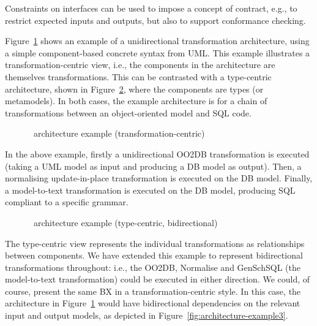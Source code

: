 Constraints on interfaces can be used to impose a concept of contract, e.g., to restrict expected inputs and outputs, but also to support conformance checking.

Figure~\ref{fig:architecture-example1} shows an example of a unidirectional transformation architecture, using a simple component-based concrete syntax from UML. This example illustrates a transformation-centric view, i.e., the components in the architecture are themselves transformations. This can be contrasted with a type-centric architecture, shown in Figure~\ref{fig:architecture-example2}, where the components are types (or metamodels). In both cases, the example architecture is for a chain of transformations between an object-oriented model and SQL code.

\begin{figure}[htbp]
\caption{\transml\ architecture example (transformation-centric)}
\label{fig:architecture-example1}
\end{figure}

In the above example, firstly a unidirectional OO2DB transformation is executed (taking a UML model as input and producing a DB model as output). Then, a normalising update-in-place transformation is executed on the DB model. Finally, a model-to-text transformation is executed on the DB model, producing SQL compliant to a specific grammar.

\begin{figure}[htbp]
\caption{\transml\ architecture example (type-centric, bidirectional)}
\label{fig:architecture-example2}
\end{figure}

The type-centric view represents the individual transformations as relationships between components. We have extended this example to represent bidirectional transformations throughout: i.e., the OO2DB, Normalise and GenSchSQL (the model-to-text transformation) could be executed in either direction.  We could, of course, present the same BX in a transformation-centric style. In this case, the architecture in Figure~\ref{fig:architecture-example1} would have bidirectional dependencies on the relevant input and output models, as depicted in Figure~\ref{fig:architecture-example3}.

